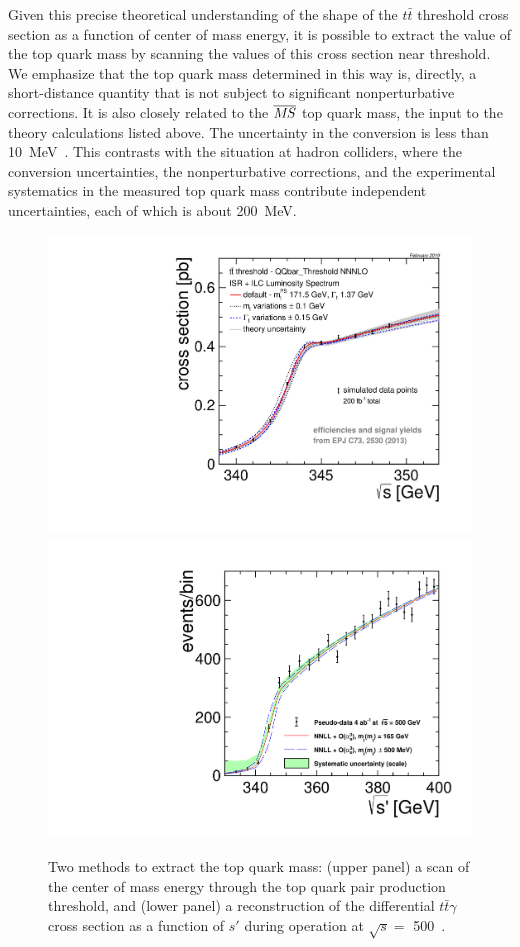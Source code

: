 Given this precise theoretical understanding of the shape of the
$t\bar t$ threshold cross section as a function of center of mass
energy, it is possible to extract the value of the top quark mass by
scanning the values of  this cross section near threshold.  We
emphasize that the top quark mass determined in this way is, directly,
a short-distance quantity that is not subject to significant
nonperturbative corrections.
It is also closely related to the $\msb$ top quark mass, the input to
the theory calculations listed above. The uncertainty in the
conversion is less than 10~MeV~\cite{Marquard:2015qpa}.  This
contrasts with the situation at hadron colliders, where the
conversion uncertainties, the nonperturbative corrections, and the
experimental systematics in the measured top quark mass
contribute  independent uncertainties, each of which is about
200~MeV. 


\begin{figure}[tb]
 \begin{center}
 \includegraphics[width=0.8\hsize]{chapters/figures/thresholdscan_top_mass.pdf}
 \includegraphics[width=0.8\hsize]{chapters/figures/alternative_top_mass.pdf}
\caption{Two methods to extract the top quark mass: (upper panel) a scan of the center 
of mass energy through the top quark pair production threshold, and (lower panel) a reconstruction of the differential $t\bar{t}\gamma$ cross section as a function of 
$s'$ during operation at $\sqrt{s}=$ 500~\GeV{}.
\label{fig:top_mass}}
 \end{center}
 \vspace{-0.7cm}
 \end{figure}
 


